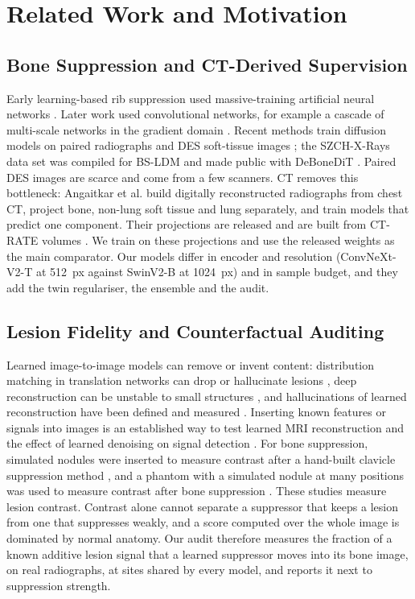 \section{Related Work and Motivation}
\label{sec:related}

\subsection{Bone Suppression and CT-Derived Supervision}
Early learning-based rib suppression used massive-training artificial neural networks \cite{suzuki2006mtann}. Later work used
convolutional networks, for example a cascade of multi-scale networks in the gradient domain \cite{yang2017cascade}. Recent methods train
diffusion models on paired radiographs and DES soft-tissue images
\cite{chen2024bsdiff,sun2026bsldm,sun2025gllcm,sun2026debonedit}; the SZCH-X-Rays data set was compiled for BS-LDM \cite{sun2026bsldm}
and made public with DeBoneDiT \cite{sun2026debonedit}. Paired DES images are scarce and come from a few scanners. CT removes this
bottleneck: Angaitkar et al. \cite{angaitkar2026anatomy} build digitally reconstructed radiographs from chest CT, project bone, non-lung
soft tissue and lung separately, and train models that predict one component. Their projections are released and are built from CT-RATE
volumes \cite{hamamci2026ctrate}. We train on these projections and use the released weights as the main comparator. Our models differ in
encoder and resolution (ConvNeXt-V2-T \cite{woo2023convnextv2} at 512~px against SwinV2-B \cite{liu2022swinv2} at 1024~px) and in
sample budget, and they add the twin regulariser, the ensemble and the audit.

\subsection{Lesion Fidelity and Counterfactual Auditing}
Learned image-to-image models can remove or invent content: distribution matching in translation networks can drop or hallucinate lesions
\cite{cohen2018distribution}, deep reconstruction can be unstable to small structures \cite{antun2020instabilities}, and hallucinations
of learned reconstruction have been defined and measured \cite{bhadra2021hallucinations,tivnan2024hallucination}. Inserting known
features or signals into images is an established way to test learned MRI reconstruction \cite{cheng2020addressing} and the effect of
learned denoising on signal detection \cite{li2021assessing}. For bone suppression, simulated nodules were inserted to measure contrast
after a hand-built clavicle suppression method \cite{hogeweg2013suppression}, and a phantom with a simulated nodule at many positions was
used to measure contrast after bone suppression \cite{takagi2020dose}. These studies measure lesion contrast. Contrast alone cannot
separate a suppressor that keeps a lesion from one that suppresses weakly, and a score computed over the whole image is dominated by
normal anatomy. Our audit therefore measures the fraction of a known additive lesion signal that a learned suppressor moves into its bone
image, on real radiographs, at sites shared by every model, and reports it next to suppression strength.

